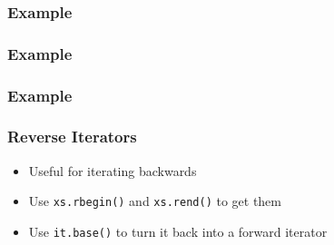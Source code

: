 \begin{frame}
  \frametitle{Example}
\end{frame}

\begin{frame}
  \frametitle{Example}
\end{frame}

\begin{frame}
  \frametitle{Example}
\end{frame}

\begin{frame}
  \frametitle{Reverse Iterators}
  \begin{itemize}
    \item Useful for iterating backwards
    \item Use \texttt{xs.rbegin()} and \texttt{xs.rend()} to get them
    \item Use \texttt{it.base()} to turn it back into a forward iterator
  \end{itemize}
\end{frame}






